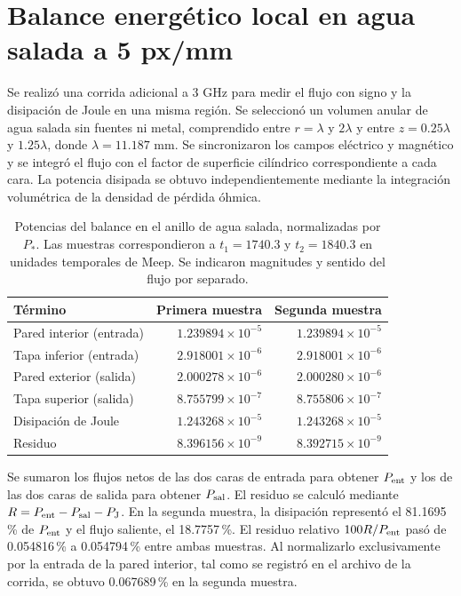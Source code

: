 \section{Balance energético local en agua salada a 5 px/mm}\label{sec:balance-agua-cinco}
Se realizó una corrida adicional a 3 GHz para medir el flujo con signo y la disipación de Joule en una misma región. Se seleccionó un volumen anular de agua salada sin fuentes ni metal, comprendido entre $r=\lambda$ y $2\lambda$ y entre $z=0.25\lambda$ y $1.25\lambda$, donde $\lambda=11.187$ mm. Se sincronizaron los campos eléctrico y magnético y se integró el flujo con el factor de superficie cilíndrico correspondiente a cada cara. La potencia disipada se obtuvo independientemente mediante la integración volumétrica de la densidad de pérdida óhmica.

\begin{table}[htbp]\centering\small
\caption{Potencias del balance en el anillo de agua salada, normalizadas por $P_*$. Las muestras correspondieron a $t_1=1740.3$ y $t_2=1840.3$ en unidades temporales de Meep. Se indicaron magnitudes y sentido del flujo por separado.}\label{tab:balance-agua-cinco}
\begin{tabular}{lrr}\hline
Término & Primera muestra & Segunda muestra \\ \hline
Pared interior (entrada) & $1.239894\times10^{-5}$ & $1.239894\times10^{-5}$ \\
Tapa inferior (entrada) & $2.918001\times10^{-6}$ & $2.918001\times10^{-6}$ \\
Pared exterior (salida) & $2.000278\times10^{-6}$ & $2.000280\times10^{-6}$ \\
Tapa superior (salida) & $8.755799\times10^{-7}$ & $8.755806\times10^{-7}$ \\
Disipación de Joule & $1.243268\times10^{-5}$ & $1.243268\times10^{-5}$ \\
Residuo & $8.396156\times10^{-9}$ & $8.392715\times10^{-9}$ \\ \hline
\end{tabular}\end{table}

Se sumaron los flujos netos de las dos caras de entrada para obtener $P_{\rm ent}$ y los de las dos caras de salida para obtener $P_{\rm sal}$. El residuo se calculó mediante $R=P_{\rm ent}-P_{\rm sal}-P_{\rm J}$. En la segunda muestra, la disipación representó el 81.1695\,\% de $P_{\rm ent}$ y el flujo saliente, el 18.7757\,\%. El residuo relativo $100R/P_{\rm ent}$ pasó de 0.054816\,\% a 0.054794\,\% entre ambas muestras. Al normalizarlo exclusivamente por la entrada de la pared interior, tal como se registró en el archivo de la corrida, se obtuvo 0.067689\,\% en la segunda muestra.

